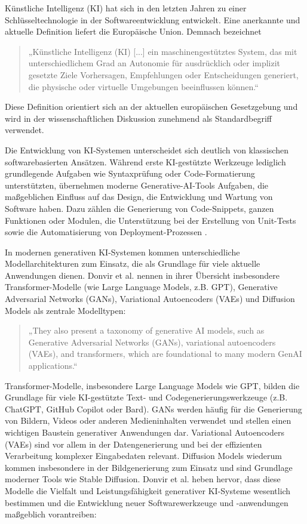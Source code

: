 Künstliche Intelligenz (KI) hat sich in den letzten Jahren zu einer
Schlüsseltechnologie in der Softwareentwicklung entwickelt. Eine anerkannte und
aktuelle Definition liefert die Europäische Union. Demnach bezeichnet

\begin{quote}
    „Künstliche Intelligenz (KI) [...] ein maschinengestütztes System, das mit unterschiedlichem Grad an Autonomie für ausdrücklich oder implizit gesetzte Ziele Vorhersagen, Empfehlungen oder Entscheidungen generiert, die physische oder virtuelle Umgebungen beeinflussen können.“
\end{quote}
\cite{noauthor_verordnung_nodate}

Diese Definition orientiert sich an der aktuellen europäischen Gesetzgebung und
wird in der wissenschaftlichen Diskussion zunehmend als Standardbegriff
verwendet.

Die Entwicklung von KI-Systemen unterscheidet sich deutlich von klassischen
softwarebasierten Ansätzen. Während erste KI-gestützte Werkzeuge lediglich
grundlegende Aufgaben wie Syntaxprüfung oder Code-Formatierung unterstützten,
übernehmen moderne Generative-AI-Tools Aufgaben, die maßgeblichen Einfluss auf
das Design, die Entwicklung und Wartung von Software haben. Dazu zählen die
Generierung von Code-Snippets, ganzen Funktionen oder Modulen, die
Unterstützung bei der Erstellung von Unit-Tests sowie die Automatisierung von
Deployment-Prozessen \cite{donvir_role_2024}.

In modernen generativen KI-Systemen kommen unterschiedliche Modellarchitekturen
zum Einsatz, die als Grundlage für viele aktuelle Anwendungen dienen. Donvir et
al. \cite{donvir_role_2024} nennen in ihrer Übersicht insbesondere
Transformer-Modelle (wie Large Language Models, z.B. GPT), Generative
Adversarial Networks (GANs), Variational Autoencoders (VAEs) und Diffusion
Models als zentrale Modelltypen:

\begin{quote}
    „They also present a taxonomy of generative AI models, such as Generative Adversarial Networks (GANs), variational autoencoders (VAEs), and transformers, which are foundational to many modern GenAI applications.“
\end{quote}
\cite[S.~2]{donvir_role_2024}

Transformer-Modelle, insbesondere Large Language Models wie GPT, bilden die
Grundlage für viele KI-gestützte Text- und Codegenerierungswerkzeuge (z.B.
ChatGPT, GitHub Copilot oder Bard). GANs werden häufig für die Generierung von
Bildern, Videos oder anderen Medieninhalten verwendet und stellen einen
wichtigen Baustein generativer Anwendungen dar. Variational Autoencoders (VAEs)
sind vor allem in der Datengenerierung und bei der effizienten Verarbeitung
komplexer Eingabedaten relevant. Diffusion Models wiederum kommen insbesondere
in der Bildgenerierung zum Einsatz und sind Grundlage moderner Tools wie Stable
Diffusion. Donvir et al. \cite{donvir_role_2024} heben hervor, dass diese
Modelle die Vielfalt und Leistungsfähigkeit generativer KI-Systeme wesentlich
bestimmen und die Entwicklung neuer Softwarewerkzeuge und -anwendungen
maßgeblich vorantreiben:

